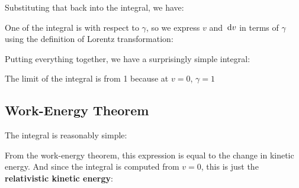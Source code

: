 
Substituting that back into the integral, we have:
  




One of the integral is with respect to $\gamma$, so we express $v$ and $\dl v$
in terms of $\gamma$ using the definition of Lorentz transformation:


Putting everything together, we have a surprisingly simple integral:


The limit of the integral is from 1 because at $v=0$, $\gamma=1$




\subsection{Work-Energy Theorem}
The integral is reasonably simple:

%  
From the work-energy theorem, this expression is equal to the change in kinetic
energy. And since the integral is computed from $v=0$, this is just the
\textbf{relativistic kinetic energy}:
  



